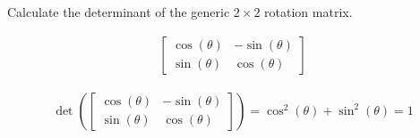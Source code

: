 Calculate the determinant of the generic $2 \times 2$ rotation matrix.

\begin{align*}
    \begin{bmatrix}
        \cos(\theta) & -\sin(\theta) \\
        \sin(\theta) & \cos(\theta)
    \end{bmatrix}
\end{align*}

\begin{solution}
\begin{align*}
    \det \left( \begin{bmatrix}
        \cos(\theta) & -\sin(\theta) \\
        \sin(\theta) & \cos(\theta)
    \end{bmatrix} \right) = 
    \cos^2(\theta) + \sin^2(\theta) = 1
\end{align*}
\end{solution}